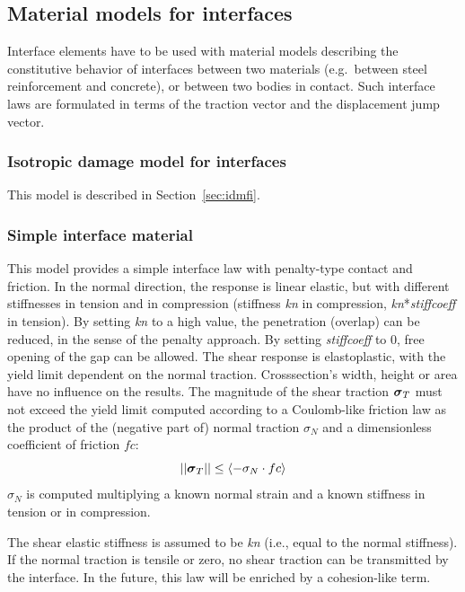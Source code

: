 \documentclass[a4paper]{article}
\newcommand{\mbf}[1]{\mbox{\boldmath$#1$}}
\newcommand{\param}[1]{{\it #1}}
\newcommand{\vsig}{\mbf{\sigma}}%
\begin{document}
\subsection{Material models for interfaces}

Interface elements have to be used with material models describing
the constitutive behavior of interfaces between two materials 
(e.g.\ between steel reinforcement and concrete),
or between two bodies in contact.
Such interface laws are formulated in terms of the traction vector and the displacement jump vector.

\subsubsection{Isotropic damage model for interfaces}

This model is described in Section~\ref{sec:idmfi}.

\subsubsection{Simple interface material}

This model provides a simple interface law with penalty-type contact and friction. 
In the normal direction, the response is linear elastic, but with different stiffnesses in tension and in compression (stiffness \param{kn} in compression, \param{kn}*\param{stiffcoeff} in tension). 
By setting \param{kn} to a high value, the penetration (overlap) can be reduced,
in the sense of the penalty approach. By setting  \param{stiffcoeff} to 0, free opening
of the gap can be allowed.
The shear response is elastoplastic, with the yield limit dependent on the normal traction. Crosssection's width, height or area have no influence on the results.
The magnitude of the shear traction $\vsig_T$ must not exceed the yield limit computed 
according to a Coulomb-like friction law as the product of the (negative part of)
 normal traction $\sigma_N$ and a dimensionless coefficient of friction $fc$:
\begin{equation}
    ||\vsig_T|| \leq \left\langle-\sigma_N\cdot fc\right\rangle 
\end{equation}
$\sigma_N$ is computed multiplying a known normal strain and a known stiffness in 
tension or in compression.

The shear elastic stiffness is assumed to be \param{kn} (i.e., equal to the
normal stiffness). If the normal traction is tensile
or zero, no shear traction can be transmitted by the interface.
In the future, this law will be enriched by a cohesion-like term.
\end{document}
